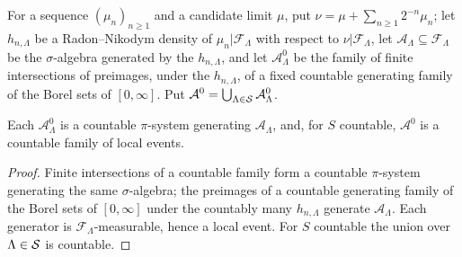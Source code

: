 \begin{definition}
    \label{def:cp-dens}
    \leanok

    For a sequence $(\mu_n)_{n \geq 1}$ and a candidate limit $\mu$, put
    $\nu = \mu + \sum_{n \geq 1} 2^{-n}\mu_n$; let $h_{n,\Lambda}$ be a Radon--Nikodym density
    of $\mu_n|\mathcal{F}_\Lambda$ with respect to $\nu|\mathcal{F}_\Lambda$, let
    $\mathcal{A}_\Lambda \subseteq \mathcal{F}_\Lambda$ be the $\sigma$-algebra generated by the
    $h_{n,\Lambda}$, and let $\mathcal{A}^0_\Lambda$ be the family of finite intersections of
    preimages, under the $h_{n,\Lambda}$, of a fixed countable generating family of the Borel
    sets of $[0,\infty]$. Put $\mathcal{A}^0 = \bigcup_{\Lambda \in \mathcal{S}} \mathcal{A}^0_\Lambda$.
\end{definition}

\begin{lemma}
    \label{lem:cp-dens-countable}
    \leanok

    Each $\mathcal{A}^0_\Lambda$ is a countable $\pi$-system generating $\mathcal{A}_\Lambda$,
    and, for $S$ countable, $\mathcal{A}^0$ is a countable family of local events.
\end{lemma}
\begin{proof}
    \leanok

    Finite intersections of a countable family form a countable $\pi$-system generating the same
    $\sigma$-algebra; the preimages of a countable generating family of the Borel sets of
    $[0,\infty]$ under the countably many $h_{n,\Lambda}$ generate $\mathcal{A}_\Lambda$. Each
    generator is $\mathcal{F}_\Lambda$-measurable, hence a local event. For $S$ countable the
    union over $\Lambda \in \mathcal{S}$ is countable.
\end{proof}

